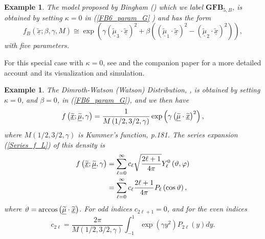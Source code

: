 \documentclass[preprint,11pt,a4paper]{elsarticle}
\newtheorem{example}[theorem]{Example}
\begin{document}
\begin{example}
The model proposed by Bingham (\cite{bingham1974antipodally}) which we label 
$\mathbf{GFB}_{5,B}$, is obtained by setting $\kappa=0$ in (\ref{FB6_param_G}%
) and has the form%
\begin{equation*}
f_{B}\left( \underline{\widetilde{x}};\beta,\gamma,M\right) \cong\exp\left(
\gamma\left( \widetilde{\underline{\mu}}_{3}\cdot\underline{\widetilde{x}}%
\right) ^{2}+\beta\left( \left( \widetilde{\underline{\mu}}_{1}\cdot%
\underline{\widetilde{x}}\right) ^{2}-\left( \widetilde{\underline{\mu }}%
_{2}\cdot\underline{\widetilde{x}}\right) ^{2}\right) \right) ,
\end{equation*}
with five parameters.
\end{example}

For this special case with $\kappa=0$, see \cite{bingham1974antipodally} and
the companion paper \cite{TGy_RSJ_WB2017} for a more detailed account and
its visualization and simulation.

\begin{example}
\label{Example_DW} The Dimroth-Watson (Watson) Distribution, \cite%
{watson1983statistics}, is obtained by setting $\kappa=0$, and $\beta=0$, in
(\ref{FB6_param_G}), and we then have 
\begin{equation}
f\left( \underline{\widetilde{x}};\underline{\widetilde{\mu}},\gamma\right) =%
\frac{1}{M\left( 1/2,3/2,\gamma\right) }\exp\left( \gamma\left( \underline{%
\widetilde{\mu}}\cdot\underline{\widetilde{x}}\right) ^{2}\right) ,
\label{Distr_DW}
\end{equation}
where $M\left( 1/2,3/2,\gamma\right) $ is Kummer's function, \cite%
{mardia2009directional} p.181. The series expansion (\ref{Series_f_L}) of
this density is 
\begin{align}
f\left( \underline{\widetilde{x}};\underline{\widetilde{\mu}},\gamma\right)
& =\sum_{\ell=0}^{\infty}c_{\ell}\sqrt{\frac{2\ell+1}{4\pi}}%
Y_{\ell}^{0}\left( \vartheta,\varphi\right)  \label{Density_Watson} \\
& =\sum_{\ell=0}^{\infty}c_{\ell}\frac{2\ell+1}{4\pi}P_{\ell}\left(
\cos\vartheta\right) ,  \notag
\end{align}
where $\vartheta=\arccos\left( \underline{\widetilde{\mu}}\cdot \underline{%
\widetilde{x}}\right) $. For odd indices $c_{2\ell+1}=0$, and for the even
indices%
\begin{equation}
c_{2\ell}=\frac{2\pi}{M\left( 1/2,3/2,\gamma\right) }\int_{-1}^{1}\exp\left(
\gamma y^{2}\right) P_{2\ell}\left( y\right) dy.  \label{c_el_DW}
\end{equation}
\end{example}
\end{document}

